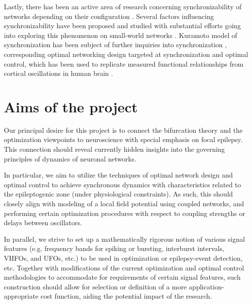 \documentclass[a4paper,11pt]{scrartcl}
\begin{document}
Lastly, there has been an active area of research concerning synchronizability of networks depending on their configuration \cite{Hong2004, Nishikawa2003}. Several factors influencing synchronizability have been proposed and studied with substantial efforts going into exploring this phenomenon on small-world networks \cite{Hong2002, Hong2002-1}. Kuramoto model of synchronization \cite{Kuramoto1984} has been subject of further inquiries into synchronization \cite{Hong2011}, corresponding optimal networking design targeted at synchronization \cite{Fazlyab2017, Nishikawa2006} and optimal control, which has been used to replicate measured functional relationships from cortical oscillations in human brain \cite{Menara2022}.


\section{Aims of the project}\label{sec:aims}

Our principal desire for this project is to connect the bifurcation theory and the optimization viewpoints to neuroscience with special emphasis on focal epilepsy. This connection should reveal currently hidden insights into the governing principles of dynamics of neuronal networks.

In particular, we aim to utilize the techniques of optimal network design \cite{Motter2007} and optimal control \cite{Agrachev2023, Baggio2021} to achieve synchronous dynamics with characteristics related to the epileptogenic zone (under physiological constraints). As such, this should closely align with modeling of a local field potential using coupled networks, and performing certain optimization procedures with respect to coupling strengths or delays between oscillators. 

In parallel, we strive to set up a mathematically rigorous notion of various signal features (e.g. frequency bands for spiking or bursting, interburst intervals, VHFOs, and UFOs, etc.) \cite{Wedler2022, Srivastava2016} to be used in optimization or epilepsy-event detection, etc. Together with modifications of the current optimization and optimal control methodologies to accommodate for requirements of certain signal features, such construction should allow for selection or definition of a more application-appropriate cost function, aiding the potential impact of the research.
\end{document}
